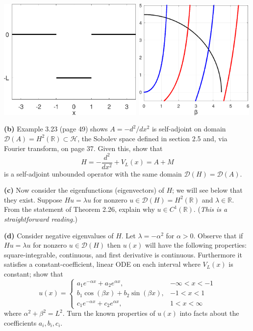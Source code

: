 \documentclass[12pt]{amsart}
\newcommand{\cD}{\mathcal{D}}
\newcommand{\cH}{\mathcal{H}}
\newcommand{\RR}{\mathbb{R}}
\newcommand{\epart}[1]{\medskip\noindent\textbf{(#1)}\quad }
\begin{document}
\bigskip
\begin{center}
\mbox{\includegraphics[height=60mm]{figs/squarepot.pdf} \hspace{10mm} \includegraphics[height=60mm]{figs/squareeigs.png}}
\end{center}

\medskip
\epart{b}  Example 3.23 (page 49) shows $A = -d^2/dx^2$ is self-adjoint on domain $\cD(A)=H^2(\RR)\subset\cH$, the Sobolev space defined in section 2.5 and, via Fourier transform, on page 37.  Given this, show that
	$$H=-\frac{d^2}{dx^2} + V_L(x) = A + M$$
is a self-adjoint unbounded operator with the same domain $\cD(H)=\cD(A)$.

\epart{c}  Now consider the eigenfunctions (eigenvectors) of $H$; we will see below that they exist.  Suppose $Hu=\lambda u$ for nonzero $u\in\cD(H)=H^2(\RR)$ and $\lambda\in\RR$.  From the statement of Theorem 2.26, explain why $u\in C^1(\RR)$.  (\emph{This is a straightforward reading.})

\epart{d}  Consider negative eigenvalues of $H$.  Let $\lambda=-\alpha^2$ for $\alpha > 0$.  Observe that if $Hu=\lambda u$ for nonzero $u\in\cD(H)$ then $u(x)$ will have the following properties: square-integrable, continuous, and first derivative is continuous.  Furthermore it satisfies a constant-coefficient, linear ODE on each interval where $V_L(x)$ is constant; show that
    $$u(x) = \begin{cases}
                a_1 e^{-\alpha x} + a_2 e^{\alpha x}, & -\infty < x < -1 \\
                b_1 \cos(\beta x) + b_2 \sin(\beta x), & -1 < x < 1 \\
                c_1 e^{-\alpha x} + c_2 e^{\alpha x}, & 1 < x < \infty
             \end{cases}$$
where $\alpha^2+\beta^2=L^2$.  Turn the known properties of $u(x)$ into facts about the coefficients $a_i,b_i,c_i$.
\end{document}

